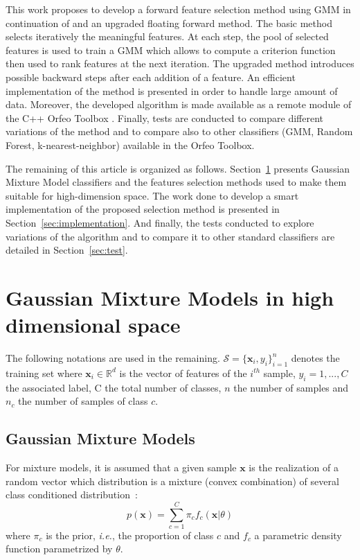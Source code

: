 \documentclass[journal,peerreview,onecolumn]{IEEEtran}
\begin{document}
This work proposes to develop a forward feature selection method using GMM in continuation of \cite{fauvel2015fast} and an upgraded floating forward method. The basic method selects iteratively the meaningful features. At each step, the pool of selected features is used to train a GMM which allows to compute a criterion function then used to rank features at the next iteration. The upgraded method introduces possible backward steps after each addition of a feature. An efficient implementation of the method is presented in order to handle large amount of data. Moreover, the developed algorithm is made available as a remote module of the C++ Orfeo Toolbox \cite{christophe2008orfeo}. Finally, tests are conducted to compare different variations of the method and to compare also to other classifiers (GMM, Random Forest, k-nearest-neighbor) available in the Orfeo Toolbox.

The remaining of this article is organized as follows. Section~\ref{sec:gmm-hd} presents Gaussian Mixture Model classifiers and the features selection methods used to make them suitable for high-dimension space. The work done to develop a smart implementation of the proposed selection method is presented in Section~\ref{sec:implementation}. And finally, the tests conducted to explore variations of the algorithm and to compare it to other standard classifiers are detailed in Section~\ref{sec:test}.

\section{Gaussian Mixture Models in high dimensional space}
\label{sec:gmm-hd}

The    following    notations    are   used    in    the    remaining.
$\mathcal{S}  = \{\mathbf{x}_i,y_i\}_{i=1}^{n}$  denotes the  training
set where $\mathbf{x}_i \in \mathbb{R}^d$ is the vector of features of
the $i^{th}$ sample, $y_i = 1,...,C$ the associated label, C the total
number of classes,  $n$ the number of samples and  $n_c$ the number of
samples of class $c$.

\subsection{Gaussian Mixture Models}

For mixture models, it is assumed  that a given sample $\mathbf{x}$ is
the realization  of a  random vector which  distribution is  a mixture
(convex     combination)     of      several     class     conditioned
distribution~\cite{Fraley00model-basedclustering}:
    \begin{equation}
        p(\mathbf{x}) = \sum_{c=1}^{C} \pi_c f_c(\mathbf{x}|\theta)
    \end{equation}
    where $\pi_c$ is  the prior, \emph{i.e.}, the  proportion of class
    $c$  and  $f_c$  a  parametric density  function  parametrized  by
    $\theta$.
\end{document}
